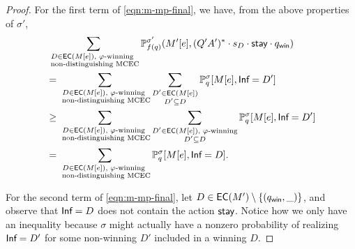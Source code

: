 \documentclass[a4paper,USenglish,cleveref, autoref, thm-restate]{lipics-v2021}
\newcommand*{\pr}{\mathbb{P}}
\newcommand\D{\mathcal{D}}
\newcommand\ecs{\textrm{\sf EC}}
\newcommand\Inf{\textrm{\sf Inf}}
\def\winabsorb{q_{\sf win}}
\def\actionstay{\textrm{\sf stay}}
\begin{document}
\begin{proof}
  For the first term of \eqref{eqn:m-mp-final}, we have, from the above properties of $\sigma'$, 
  \begin{align*}
    & \sum_{\substack{D \in \ecs(M[e]), \text{ $\varphi$-winning }\\\text{ non-distinguishing MCEC}}} \pr_{f(q)}^{\sigma'}(M'[e],(Q'A')^*\cdot s_D \cdot \actionstay\cdot \winabsorb)\\
    &= \sum_{\substack{D \in \ecs(M[e]), \text{ $\varphi$-winning }\\\text{ non-distinguishing MCEC}}}\sum_{\substack{D' \in \ecs(M[e])\\D' \subseteq D}} \pr_q^\sigma[M[e], \Inf=D']\\
    &\geq \sum_{\substack{D \in \ecs(M[e]), \text{ $\varphi$-winning }\\\text{ non-distinguishing MCEC}}}\sum_{\substack{D' \in \ecs(M[e]), \text{ $\varphi$-winning} \\D' \subseteq D}} \pr_q^\sigma[M[e], \Inf=D']
    \\&=\sum_{\substack{D \in \ecs(M[e]), \text{ $\varphi$-winning }\\\text{ non-distinguishing MCEC}}} \pr_q^\sigma[M[e], \Inf=D].
  \end{align*}

  For the second term of \eqref{eqn:m-mp-final}, let $D\in \ecs(M')\setminus \{(\winabsorb,\_)\}$, and observe that $\Inf=D$ does not contain the action $\actionstay$.
  Notice how we only have an inequality because $\sigma$ might actually have a nonzero probability of realizing $\Inf=D'$ for some non-winning $D'$ included in a winning $D$.


\end{proof}
\end{document}
